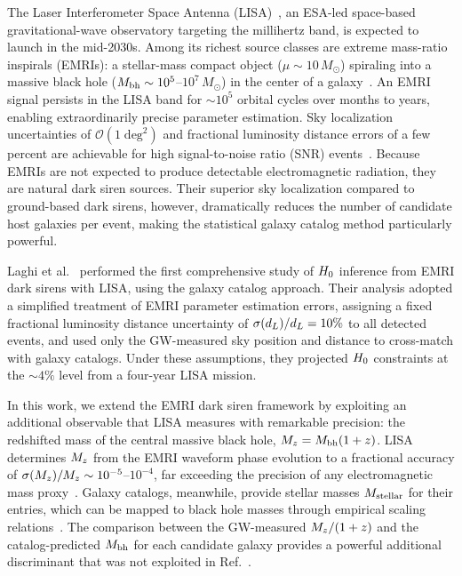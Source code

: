 The Laser Interferometer Space Antenna (LISA)~\cite{LISA:2024hlh}, an
ESA-led space-based gravitational-wave observatory targeting the
millihertz band, is expected to launch in the mid-2030s.  Among its
richest source classes are extreme mass-ratio inspirals (EMRIs): a
stellar-mass compact object ($\mu \sim 10\,M_\odot$) spiraling into a
massive black hole ($M_\mathrm{bh} \sim 10^5$--$10^7\,M_\odot$) in the center
of a galaxy~\cite{Babak:2017tow,LISA:2024hlh}.  An EMRI signal
persists in the LISA band for $\sim\!10^5$ orbital cycles over
months to years, enabling extraordinarily precise parameter estimation.
Sky localization uncertainties of $\mathcal{O}(1\;\mathrm{deg}^2)$
and fractional luminosity distance errors of a few percent are
achievable for high signal-to-noise ratio (SNR) events~\cite{Babak:2017tow}.
Because EMRIs are not expected to produce detectable electromagnetic
radiation, they are natural dark siren sources.  Their superior sky
localization compared to ground-based dark sirens, however, dramatically
reduces the number of candidate host galaxies per event, making the
statistical galaxy catalog method particularly powerful.

Laghi et al.~\cite{Laghi:2021pqk} performed the first comprehensive
study of $H_0$ inference from EMRI dark sirens with LISA, using the
galaxy catalog approach.  Their analysis adopted a simplified treatment
of EMRI parameter estimation errors, assigning a fixed fractional
luminosity distance uncertainty of $\sigma(d_L)/d_L = 10\%$ to all
detected events, and used only the GW-measured sky position and
distance to cross-match with galaxy catalogs.  Under these assumptions,
they projected $H_0$ constraints at the $\sim\!4\%$ level from a
four-year LISA mission.

In this work, we extend the EMRI dark siren framework by exploiting an
additional observable that LISA measures with remarkable precision: the
redshifted mass of the central massive black hole, $M_z = M_\mathrm{bh}(1+z)$.
LISA determines $M_z$ from the EMRI waveform phase evolution to a
fractional accuracy of $\sigma(M_z)/M_z \sim 10^{-5}$--$10^{-4}$,
far exceeding the precision of any electromagnetic mass
proxy~\cite{Babak:2017tow}.  Galaxy catalogs, meanwhile, provide
stellar masses $M_\mathrm{stellar}$ for their entries, which can be mapped to
black hole masses through empirical scaling
relations~\cite{Reines:2015moa}.  The comparison between the
GW-measured $M_z/(1+z)$ and the catalog-predicted $M_\mathrm{bh}$ for each
candidate galaxy provides a powerful additional discriminant that was
not exploited in Ref.~\cite{Laghi:2021pqk}.

